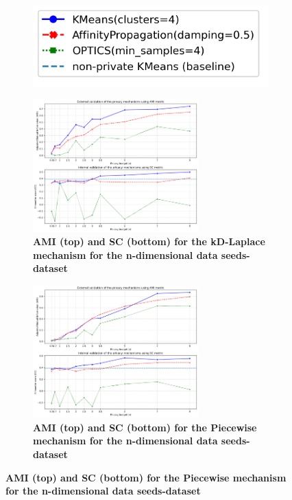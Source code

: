 \begin{figure}[H]
    \centering
    \begin{subfigure}{0.30\textwidth}
        \includegraphics[width=\textwidth]{Results/2d-laplace/seeds-dataset/legend.png}
    \end{subfigure}
    \begin{subfigure}{1\textwidth}
        \centering
        \includegraphics[width=0.70\textwidth]{Results/kd-laplace/kd-Laplace/seeds-dataset/ami-and-sc_8_dimensions.png}
        \centering
        \caption{\textbf{AMI (top) and SC (bottom) for the kD-Laplace mechanism for the n-dimensional data seeds-dataset}}
    \end{subfigure}
    \begin{subfigure}{1\textwidth}
        \centering
        \includegraphics[width=0.70\textwidth]{Results/kd-laplace/piecewise/seeds-dataset/ami-and-sc_8_dimensions.png}
        \caption{\textbf{AMI (top) and SC (bottom) for the Piecewise mechanism for the n-dimensional data seeds-dataset}}
    \end{subfigure}
    \label{fig:validation-seeds-dataset_comparison_nd-laplace}
\end{figure}

